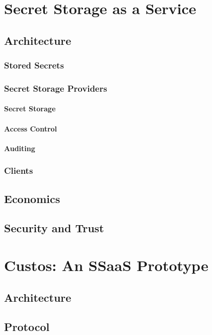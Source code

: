 \documentclass[defaultstyle,11pt]{thesis}
\begin{document}
%
\chapter{Secret Storage as a Service}
\label{chap:ssaas}

\section{Architecture}
\subsection{Stored Secrets}
\subsection{Secret Storage Providers}
\subsubsection{Secret Storage}
\subsubsection{Access Control}
\subsubsection{Auditing}
\subsection{Clients}
\section{Economics}
\section{Security and Trust}

%
\chapter{Custos: An SSaaS Prototype}
\label{chap:custos}

\section{Architecture}
\section{Protocol}
\end{document}
